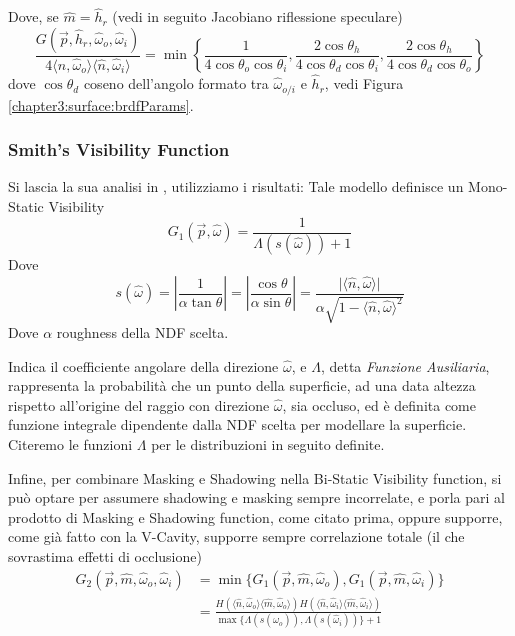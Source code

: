 Dove, se $\hat{m} = \hat{h}_r$ (vedi in seguito Jacobiano riflessione speculare)
\begin{equation}
	\frac{G(\vec{p},\hat{h}_r,\hat{\omega}_o,\hat{\omega}_i)}{4\langle\hat{n},\hat{\omega}_o\rangle\langle\hat{n},\hat{\omega}_i\rangle}=%
		\min\left\{\frac{1}{4\cos\theta_o\cos\theta_i},
		\frac{2\cos\theta_h}{4\cos\theta_d\cos\theta_i}, \frac{2\cos\theta_h}{4\cos\theta_d\cos\theta_o}\right\}
\end{equation}
dove $\cos\theta_d$ coseno dell'angolo formato tra $\hat{\omega}_{o/i}$ e $\hat{h}_r$, vedi Figura \ref{chapter3:surface:brdfParams}.
\subsubsection{Smith's Visibility Function}
Si lascia la sua analisi in \cite{pegoraro}, utilizziamo i risultati: Tale modello definisce un Mono-Static Visibility
\begin{equation}
	G_1(\vec{p},\hat{\omega})=\frac{1}{\Lambda(s(\hat{\omega}))+1}
\end{equation}
Dove 
\begin{equation*}
	s(\hat{\omega}) = \left\vert\frac{1}{\alpha\tan\theta}\right\vert = \left\vert\frac{\cos\theta}{\alpha\sin\theta}\right\vert = %
		\frac{\vert\langle\hat{n},\hat{\omega}\rangle\vert}{\alpha\sqrt{1-\langle\hat{n},\hat{\omega}\rangle^2}}
\end{equation*}
Dove $\alpha$ roughness della NDF scelta.\par
Indica il coefficiente angolare della direzione $\hat{\omega}$, e $\Lambda$, detta \textit{Funzione Ausiliaria}, rappresenta la probabilit\`a 
che un punto della superficie, ad una data altezza rispetto all'origine del raggio con direzione $\hat{\omega}$, sia occluso, ed \`e definita come 
funzione integrale dipendente dalla NDF scelta per modellare la superficie. Citeremo le funzioni $\Lambda$ per le distribuzioni in seguito definite.\par
Infine, per combinare Masking e Shadowing nella Bi-Static Visibility function, si pu\`o optare per assumere shadowing e masking sempre incorrelate,
e porla pari al prodotto di Masking e Shadowing function, come citato prima, oppure supporre, come gi\`a fatto con la V-Cavity, supporre sempre 
correlazione totale (il che sovrastima effetti di occlusione)
\begin{align}
	G_2(\vec{p},\hat{m},\hat{\omega}_o,\hat{\omega}_i)&=\min\{G_1(\vec{p},\hat{m},\hat{\omega}_o),G_1(\vec{p},\hat{m},\hat{\omega}_i)\} \nonumber \\
	&=\frac{H(\langle\hat{n},\hat{\omega}_o\rangle\langle\hat{m},\hat{\omega}_o\rangle)%
			H(\langle\hat{n},\hat{\omega}_i\rangle\langle\hat{m},\hat{\omega}_i\rangle)}%
		{\max\{\Lambda(s(\hat{\omega}_o)),\Lambda(s(\hat{\omega}_i))\}+1}
\end{align}
